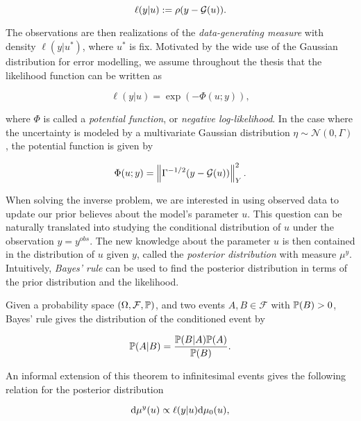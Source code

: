 \begin{equation}\label{def-ell}
  \ell(y|u) := \rho(y - \G(u)).
\end{equation}

The observations are then realizations of the \textit{data-generating measure} with density $\ell(y|u^*)$, where $u^*$ is fix. Motivated by the wide use of the Gaussian distribution for error modelling, we assume throughout the thesis that the likelihood function can be written as

\begin{equation} \label{exponential-ell}
  \ell(y|u) = \exp(-\Phi(u;y)),
\end{equation}

where $\Phi$ is called a \textit{potential function}, or \textit{negative log-likelihood}. In the case where the uncertainty is modeled by a multivariate Gaussian distribution $\eta \sim \mathcal{N}(0, \Gamma)$, the potential function is given by

\begin{equation} \label{gaussian-potential}
  \Phi(u; y) = \norm{\Gamma^{-1/2}(y - \G(u))}_Y^2.
\end{equation}

When solving the inverse problem, we are interested in using observed data to update our prior believes about the model's parameter $u$. This question can be naturally translated into studying the conditional distribution of $u$ under the observation $y = y^{obs}$. The new knowledge about the parameter $u$ is then contained in the distribution of $u$ given $y$, called the \textit{posterior distribution} with measure $\mu^y$. Intuitively, \textit{Bayes' rule} can be used to find the posterior distribution in terms of the prior distribution and the likelihood.

Given a probability space $(\Omega, \mathcal{F}, \P)$, and two events $A, B \in \mathcal{F}$ with $\P(B) > 0$, Bayes' rule gives the distribution of the conditioned event by

\begin{equation*}
  \P(A|B) = \frac{\P(B|A)\P(A)}{\P(B)}.
\end{equation*}

An informal extension of this theorem to infinitesimal events gives the following relation for the posterior distribution 

\begin{equation}\label{bayes-rule}
  \d\mu^y(u) \propto \ell(y|u)\d\mu_0(u),
\end{equation}

